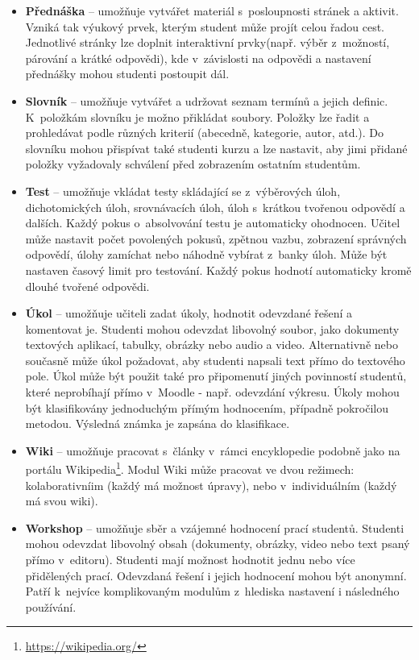 \documentclass[
print,
  11pt,
  table,   
  nolof,    
  nolot,
  oneside,
  draft
]{fithesis3}
\begin{document}
\begin{itemize}
\item \textbf{Přednáška} -- umožňuje vytvářet materiál s~posloupnosti stránek a aktivit. Vzniká tak výukový prvek, kterým student může projít celou řadou cest. Jednotlivé stránky lze doplnit interaktivní prvky(např. výběr z~možností, párování a krátké odpovědi), kde v~závislosti na odpovědi a nastavení přednášky mohou studenti postoupit dál.

\item \textbf{Slovník} -- umožňuje vytvářet a udržovat seznam termínů a jejich definic. K~položkám slovníku je možno přikládat soubory. Položky lze  řadit a prohledávat podle různých kriterií (abecedně, kategorie, autor, atd.). Do slovníku mohou přispívat také studenti kurzu a lze nastavit, aby jimi přidané položky vyžadovaly schválení před zobrazením ostatním studentům.

\item \textbf{Test} -- umožňuje vkládat testy skládající se z~výběrových úloh, dichotomických úloh, srovnávacích úloh, úloh s~krátkou tvořenou odpovědí a dalších. Každý pokus o~absolvování testu je automaticky ohodnocen. Učitel může nastavit počet povolených pokusů, zpětnou vazbu, zobrazení správných odpovědí, úlohy zamíchat nebo náhod\-ně vybírat z~banky úloh. Může být nastaven časový limit pro testování. Každý pokus hodnotí automaticky kromě dlouhé tvořené odpovědi.

\item \textbf{Úkol} -- umožňuje učiteli zadat úkoly, hodnotit odevzdané řešení a komentovat je. Studenti mohou odevzdat libovolný soubor, jako dokumenty textových aplikací, tabulky, obrázky nebo audio a video. Alternativně nebo současně může úkol požadovat, aby studenti napsali text přímo do textového pole. Úkol může být použit také pro připomenutí jiných povinností studentů, které neprobíhají přímo v~Moodle - např. odevzdání výkresu. Úkoly mohou být klasifikovány jednoduchým přímým hodnocením, případně pokročilou metodou. Výsledná známka je zapsána do klasifikace.

\item \textbf{Wiki} -- umožňuje pracovat s~články v~rámci encyklopedie podobně jako na portálu Wikipedia\footnote{\url{https://wikipedia.org/}}. Modul Wiki může pracovat ve dvou režimech: kolaborativníim (každý má možnost úpravy), nebo v~individuálním (každý má svou wiki).

\item \textbf{Workshop} -- umožňuje sběr a vzájemné hodnocení prací studentů. Studenti mohou odevzdat libovolný obsah (dokumenty, obrázky, video nebo text psaný přímo v~editoru). Studenti mají možnost hodnotit jednu nebo více přidělených prací. Odevzdaná řešení i jejich hodnocení mohou být anonymní. Patří k~nejvíce komplikovaným modulům z~hlediska nastavení i následného používání.
\end{itemize}
\end{document}
